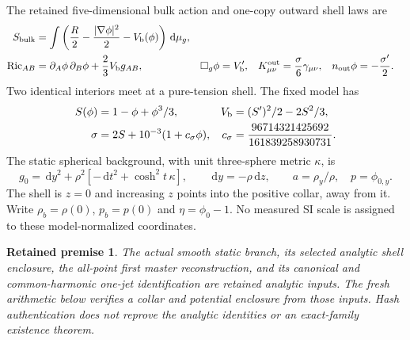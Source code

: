 \documentclass[11pt]{article}
\newcommand{\dd}{\,\mathrm d}
\newtheorem{premise}{Retained premise}
\begin{document}
The retained five-dimensional bulk action and one-copy outward shell laws are
\begin{equation}
\begin{aligned}
 S_{\rm bulk}&=\int\left(\frac R2-\frac{|\nabla\phi|^2}{2}
                                      -V_{\rm b}(\phi)\right)\dd\mu_g,\\
 {\rm Ric}_{AB}&=\partial_A\phi\,\partial_B\phi+\frac23V_{\rm b}g_{AB},
 &\Box_g\phi&=V_{\rm b}',&
 K^{\rm out}_{\mu\nu}&=\frac{\sigma}{6}\gamma_{\mu\nu},&
 n_{\rm out}\phi&=-\frac{\sigma'}2 .
\end{aligned}
\label{eq:action}
\end{equation}
Two identical interiors meet at a pure-tension shell.
The fixed model has
\begin{equation}
\begin{aligned}
 S(\phi)&=1-\phi+\phi^3/3,&
 V_{\rm b}&=(S')^2/2-2S^2/3,\\
 \sigma&=2S+10^{-3}(1+c_\sigma\phi),&
 c_\sigma&=\frac{96714321425692}{161839258930731}.
\end{aligned}
\end{equation}
The static spherical background, with unit three-sphere metric $\kappa$, is
\begin{equation}
 g_0=\dd y^2+\rho^2[-\dd t^2+\cosh^2t\,\kappa],
 \qquad \dd y=-\rho\dd z,\qquad
 a=\rho_y/\rho,\quad p=\phi_{0,y}.
 \label{eq:bg}
\end{equation}
The shell is $z=0$ and increasing $z$ points into the positive collar,
away from it. Write $\rho_b=\rho(0)$, $p_b=p(0)$ and $\eta=\phi_0-1$.
No measured SI scale is assigned to these model-normalized coordinates.

\begin{premise}
The actual smooth static branch, its selected analytic shell enclosure,
the all-point first master reconstruction, and its canonical and
common-harmonic one-jet identification are retained analytic inputs.
The fresh arithmetic below verifies a collar and potential enclosure from
those inputs. Hash authentication does not reprove the analytic identities
or an exact-family existence theorem.
\end{premise}
\end{document}

